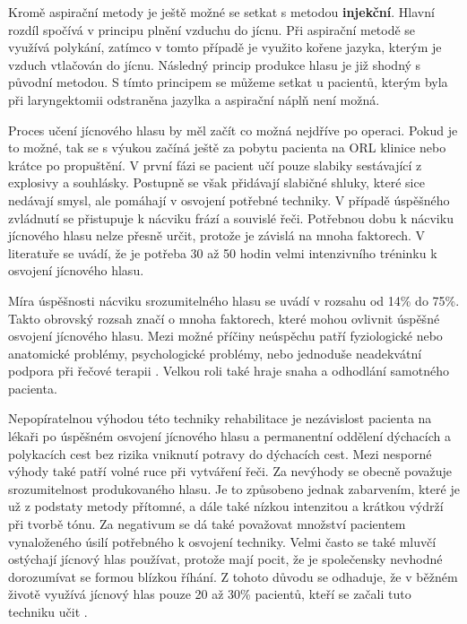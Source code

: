 Kromě aspirační metody je ještě možné se setkat s metodou \textbf{injekční}.
Hlavní rozdíl spočívá v principu plnění vzduchu do jícnu. Při aspirační metodě
se využívá polykání, zatímco v tomto případě je využito kořene jazyka, kterým
je vzduch vtlačován do jícnu. Následný princip produkce hlasu je již shodný s
původní metodou. S tímto principem se můžeme setkat u pacientů, kterým byla
při laryngektomii odstraněna jazylka a aspirační náplň není možná.

Proces učení jícnového hlasu by měl začít co možná nejdříve po operaci. Pokud
je to možné, tak se s výukou začíná ještě za pobytu pacienta na ORL klinice
nebo krátce po propuštění. V první fázi se pacient učí pouze slabiky
sestávající z explosivy a souhlásky. Postupně se však přidávají slabičné
shluky, které sice nedávají smysl, ale pomáhají v osvojení potřebné techniky.
V případě úspěšného zvládnutí se přistupuje k nácviku frází a souvislé řeči.
Potřebnou dobu k nácviku jícnového hlasu nelze přesně určit, protože je
závislá na mnoha faktorech. V literatuře se uvádí, že je potřeba 30 až 50
hodin velmi intenzivního tréninku k osvojení jícnového hlasu.

Míra úspěšnosti nácviku srozumitelného hlasu se uvádí v rozsahu od 14\% do
75\%. Takto obrovský rozsah značí o mnoha faktorech, které mohou ovlivnit
úspěšné osvojení jícnového hlasu. Mezi možné příčiny neúspěchu patří
fyziologické nebo anatomické problémy, psychologické problémy, nebo jednoduše
neadekvátní podpora při řečové terapii \cite{Brown2003}. Velkou roli také
hraje snaha a odhodlání samotného pacienta.

Nepopíratelnou výhodou této techniky rehabilitace je nezávislost pacienta na
lékaři po úspěšném osvojení jícnového hlasu a permanentní oddělení dýchacích a
polykacích cest bez rizika vniknutí potravy do dýchacích cest. Mezi nesporné
výhody také patří volné ruce při vytváření řeči. Za nevýhody se obecně
považuje srozumitelnost produkovaného hlasu. Je to způsobeno jednak
 zabarvením, které je už z podstaty metody přítomné, a dále také
nízkou intenzitou a krátkou výdrží při tvorbě tónu. Za negativum se dá také
považovat množství pacientem vynaloženého úsilí potřebného k osvojení
techniky. Velmi často se také mluvčí ostýchají jícnový hlas používat, protože
mají pocit, že je společensky nevhodné dorozumívat se formou blízkou říhání. Z
tohoto důvodu se odhaduje, že v běžném životě využívá jícnový hlas pouze 20 až
30\% pacientů, kteří se začali tuto techniku učit \cite{Hradecka2007}.


